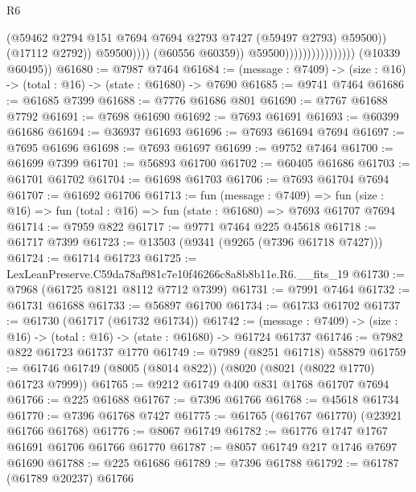 \begin{lexlean}{R6}
\begin{coremodule}
                                                    (@59462
                                                      @2794
                                                      @151
                                                      @7694
                                                      @7694
                                                      @2793
                                                      @7427
                                                      (@59497 @2793)
                                                      @59500))
                                                  (@17112 @2792))
                                                @59500))))
                                        (@60556 @60359))
                                      @59500))))))))))))))))
      (@10339 @60495))
@61680 := @7987 @7464
@61684 := (message : @7409) -> (size : @16) -> (total : @16) -> (state : @61680) -> @7690
@61685 := @9741 @7464
@61686 := @61685 @7399
@61688 := @7776 @61686 @801
@61690 := @7767 @61688 @7792
@61691 := @7698 @61690
@61692 := @7693 @61691
@61693 := @60399 @61686
@61694 := @36937 @61693
@61696 := @7693 @61694 @7694
@61697 := @7695 @61696
@61698 := @7693 @61697
@61699 := @9752 @7464
@61700 := @61699 @7399
@61701 := @56893 @61700
@61702 := @60405 @61686
@61703 := @61701 @61702
@61704 := @61698 @61703
@61706 := @7693 @61704 @7694
@61707 := @61692 @61706
@61713 := fun (message : @7409) =>
  fun (size : @16) => fun (total : @16) => fun (state : @61680) => @7693 @61707 @7694
@61714 := @7959 @822
@61717 := @9771 @7464 @225 @45618
@61718 := @61717 @7399
@61723 := @13503 (@9341 (@9265 (@7396 @61718 @7427)))
@61724 := @61714 @61723
@61725 := LexLeanPreserve.C59da78af981c7e10f46266c8a8b8b11e.R6.__fits_19
@61730 := @7968 (@61725 @8121 @8112 @7712 @7399)
@61731 := @7991 @7464
@61732 := @61731 @61688
@61733 := @56897 @61700
@61734 := @61733 @61702
@61737 := @61730 (@61717 (@61732 @61734))
@61742 := (message : @7409) -> (size : @16) -> (total : @16) -> (state : @61680) -> @61724 @61737
@61746 := @7982 @822 @61723 @61737 @1770
@61749 := @7989 (@8251 @61718) @58879
@61759 := @61746 @61749 (@8005 (@8014 @822)) (@8020 (@8021 (@8022 @1770) @61723 @7999))
@61765 := @9212 @61749 @400 @831 @1768 @61707 @7694
@61766 := @225 @61688
@61767 := @7396 @61766
@61768 := @45618 @61734
@61770 := @7396 @61768 @7427
@61775 := @61765 (@61767 @61770) (@23921 @61766 @61768)
@61776 := @8067 @61749
@61782 := @61776 @1747 @1767 @61691 @61706 @61766 @61770
@61787 := @8057 @61749 @217 @1746 @7697 @61690
@61788 := @225 @61686
@61789 := @7396 @61788
@61792 := @61787 (@61789 @20237) @61766

\end{coremodule}
\end{lexlean}
